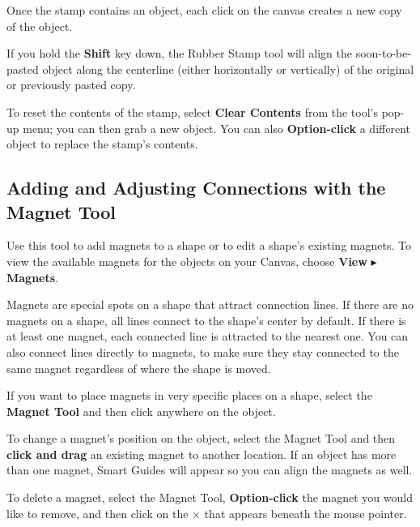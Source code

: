 \documentclass[../main.tex]{subfiles}
\begin{document}

Once the stamp contains an object, each click on the canvas creates a new copy of the object.


If you hold the \textbf{Shift} key down, the Rubber Stamp tool will align the soon-to-be-pasted
object along the centerline (either horizontally or vertically) of the original or previously
pasted copy.

To reset the contents of the stamp, select \textbf{Clear Contents} from the tool's pop-up menu;
you can then grab a new object. You can also \textbf{Option-click} a different object to
replace the stamp's contents.

\subsection{ Adding and Adjusting Connections with the
Magnet Tool}

Use this tool to add magnets to a shape or to edit a shape's existing magnets. To view the
available magnets for the objects on your Canvas, choose \textbf{View} $\blacktriangleright$
\textbf{Magnets}.

Magnets are special spots on a shape that attract connection lines. If there are no magnets on a
shape, all lines connect to the shape's center by default. If there is at least one magnet,
each connected line is attracted to the nearest one. You can also connect lines directly to
magnets, to make sure they stay connected to the same magnet regardless of where the shape is
moved.

If you want to place magnets in very specific places on a shape, select the \textbf{Magnet Tool}
and then click anywhere on the object.


To change a magnet's position on the object, select the Magnet Tool and then \textbf{click and
drag} an existing magnet to another location. If an object has more than one magnet, Smart
Guides will appear so you can align the magnets as well.


To delete a magnet, select the Magnet Tool, \textbf{Option-click} the magnet you would like to
remove, and then click on the \textbf{$\times$} that appears beneath the mouse pointer.
\end{document}
